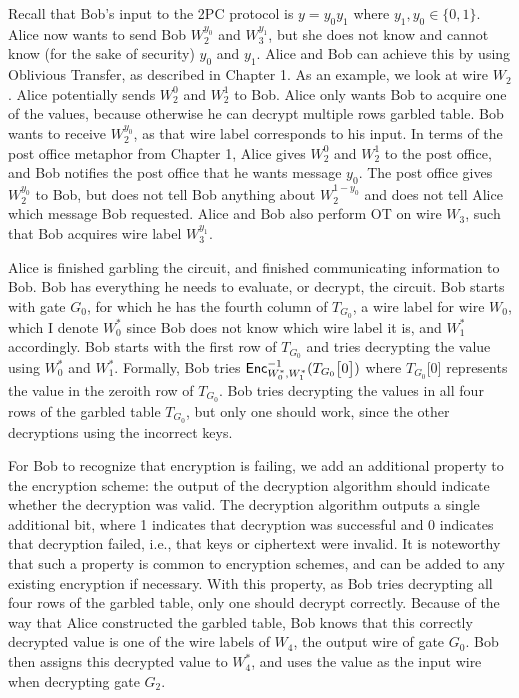 Recall that Bob's input to the 2PC protocol is $y = y_0 y_1$ where $y_1, y_0 \in \{0,1\}$.
Alice now wants to send Bob $W_2^{y_0}$ and $W_3^{y_1}$, but she does not know and cannot know (for the sake of security) $y_0$ and $y_1$.
Alice and Bob can achieve this by using Oblivious Transfer, as described in Chapter 1.
As an example, we look at wire $W_2$.
Alice potentially sends $W_2^0$ and $W_2^1$ to Bob.
Alice only wants Bob to acquire one of the values, because otherwise he can decrypt multiple rows garbled table.
Bob wants to receive $W_2^{y_0}$, as that wire label corresponds to his input.
In terms of the post office metaphor from Chapter 1, Alice gives $W_2^0$ and $W_2^1$ to the post office, and Bob notifies the post office that he wants message $y_0$.
The post office gives $W_2^{y_0}$ to Bob, but does not tell Bob anything about $W_2^{1 - y_0}$ and does not tell Alice which message Bob requested. 
Alice and Bob also perform OT on wire $W_3$, such that Bob acquires wire label $W_3^{y_1}$.

Alice is finished garbling the circuit, and finished communicating information to Bob. 
Bob has everything he needs to evaluate, or decrypt, the circuit.
Bob starts with gate $G_0$, for which he has the fourth column of $T_{G_0}$, a wire label for wire $W_0$, which I denote $W_0^*$ since Bob does not know which wire label it is, and $W_1^*$ accordingly.
Bob starts with the first row of $T_{G_0}$ and tries decrypting the value using $W_0^*$ and $W_1^*$.
Formally, Bob tries $\textsf{Enc}^{-1}_{W_0^*, W_1^*}(T_{G_0}\big[0\big])$ where $T_{G_0}\big[0\big]$ represents the value in the zeroith row of $T_{G_0}$.
Bob tries decrypting the values in all four rows of the garbled table $T_{G_0}$, but only one should work, since the other decryptions using the incorrect keys.

For Bob to recognize that encryption is failing, we add an additional property to the encryption scheme: the output of the decryption algorithm should indicate whether the decryption was valid.
The decryption algorithm outputs a single additional bit, where 1 indicates that decryption was successful and 0 indicates that decryption failed, i.e., that keys or ciphertext were invalid.
It is noteworthy that such a property is common to encryption schemes, and can be added to any existing encryption if necessary.
With this property, as Bob tries decrypting all four rows of the garbled table, only one should decrypt correctly.
Because of the way that Alice constructed the garbled table, Bob knows that this correctly decrypted value is one of the wire labels of $W_4$, the output wire of gate $G_0$.
Bob then assigns this decrypted value to $W_4^*$, and uses the value as the input wire when decrypting gate $G_2$.

